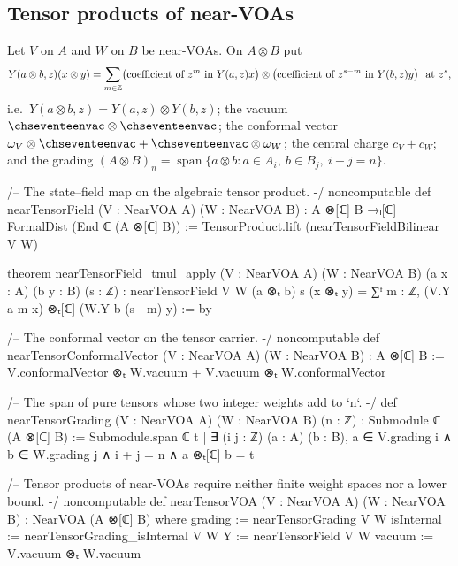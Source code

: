 \subsection{Tensor products of near-VOAs}

\begin{definition}\label{ch17:def:tensor}
Let $V$ on $A$ and $W$ on $B$ be near-VOAs.  On $A\otimes B$ put
\begin{equation}\label{ch17:eq:tensorfield}
  Y(a\otimes b,z)(x\otimes y)=\sum_{m\in{\mathbb{Z}}}\bigl(\text{coefficient of }z^m\text{ in }Y(a,z)x\bigr)\otimes
  \bigl(\text{coefficient of }z^{s-m}\text{ in }Y(b,z)y\bigr)\ \text{ at }z^s,
\end{equation}
i.e.\ $Y(a\otimes b,z)=Y(a,z)\otimes Y(b,z)$; the vacuum $\chseventeenvac\otimes\chseventeenvac$; the conformal vector
$\omega_V\otimes\chseventeenvac+\chseventeenvac\otimes\omega_W$; the central charge $c_V+c_W$; and the grading
$(A\otimes B)_n=\operatorname{span}\{a\otimes b:a\in A_i,\ b\in B_j,\ i+j=n\}$.
\end{definition}

\begin{leancode}
/-- The state–field map on the algebraic tensor product. -/
noncomputable def nearTensorField (V : NearVOA A) (W : NearVOA B) :
    A ⊗[ℂ] B →ₗ[ℂ] FormalDist (End ℂ (A ⊗[ℂ] B)) :=
  TensorProduct.lift (nearTensorFieldBilinear V W)

theorem nearTensorField_tmul_apply (V : NearVOA A) (W : NearVOA B)
    (a x : A) (b y : B) (s : ℤ) :
    nearTensorField V W (a ⊗ₜ b) s (x ⊗ₜ y) =
      ∑ᶠ m : ℤ, (V.Y a m x) ⊗ₜ[ℂ] (W.Y b (s - m) y) := by

/-- The conformal vector on the tensor carrier. -/
noncomputable def nearTensorConformalVector (V : NearVOA A) (W : NearVOA B) : A ⊗[ℂ] B :=
  V.conformalVector ⊗ₜ W.vacuum + V.vacuum ⊗ₜ W.conformalVector

/-- The span of pure tensors whose two integer weights add to `n`. -/
def nearTensorGrading (V : NearVOA A) (W : NearVOA B) (n : ℤ) :
    Submodule ℂ (A ⊗[ℂ] B) :=
  Submodule.span ℂ {t | ∃ (i j : ℤ) (a : A) (b : B),
    a ∈ V.grading i ∧ b ∈ W.grading j ∧ i + j = n ∧ a ⊗ₜ[ℂ] b = t}

/-- Tensor products of near-VOAs require neither finite weight spaces nor a lower bound. -/
noncomputable def nearTensorVOA (V : NearVOA A) (W : NearVOA B) : NearVOA (A ⊗[ℂ] B) where
  grading := nearTensorGrading V W
  isInternal := nearTensorGrading_isInternal V W
  Y := nearTensorField V W
  vacuum := V.vacuum ⊗ₜ W.vacuum
\end{leancode}

